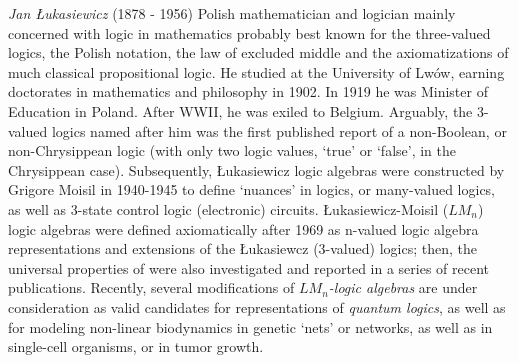 \documentclass[12pt]{article}
\begin{document}
\emph{Jan \L{}ukasiewicz} (1878 - 1956) Polish mathematician and logician mainly concerned with logic in mathematics probably best known for the three-valued logics, the Polish notation, the law of excluded middle and the axiomatizations of much classical propositional logic. He studied at the University of Lw\'ow, earning doctorates in mathematics and philosophy in 1902. In 1919 he was Minister of Education in Poland. After WWII, he was exiled to Belgium. Arguably, the 3-valued logics named after him was the first published report of a non-Boolean, or non-Chrysippean logic (with only two logic values, `true' or `false', in the Chrysippean case). Subsequently, \L ukasiewicz logic algebras were constructed by Grigore Moisil in 1940-1945 to define `nuances' in logics, or many-valued logics, as well as 3-state control logic (electronic) circuits. \L ukasiewicz-Moisil ($LM_n$) logic algebras were defined axiomatically after 1969 as n-valued logic algebra representations and extensions of the \L ukasiewcz (3-valued) logics; then, the universal properties of 
 were also investigated and reported in a series of recent publications.  Recently, several modifications of {\em $LM_n$-logic algebras} are under consideration as valid candidates for representations of {\em quantum logics}, as well as for modeling non-linear biodynamics in genetic `nets' or networks, as well as in single-cell organisms, or in tumor growth.



\end{document}
